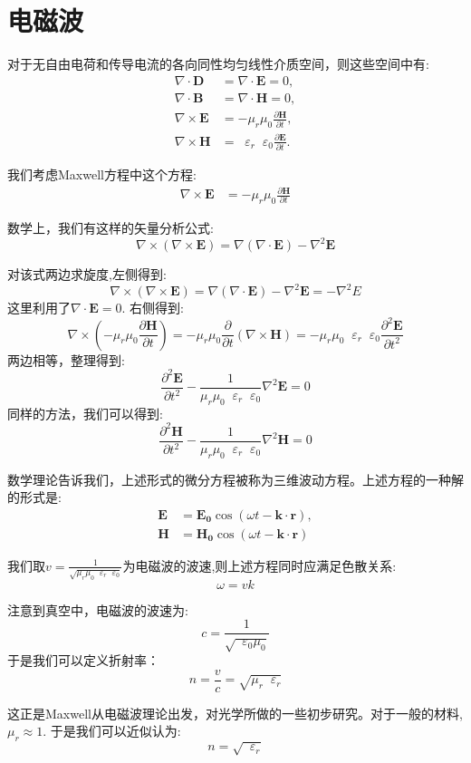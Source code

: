 \documentclass[12pt,a4paper,oneside]{report}
\theoremstyle{definition}
\theoremstyle{remark}
\newcommand{\mb}[1]{\mathbf{#1}}
\renewcommand{\v}{\mathop{}\!\varepsilon}
\begin{document}
\section{电磁波}
对于无自由电荷和传导电流的各向同性均匀线性介质空间，则这些空间中有:
\begin{align*}
\nabla\cdot\mathbf{D} &= \nabla\cdot\mathbf{E} =0, \\[4pt]
\nabla\cdot\mathbf{B} &= \nabla\cdot\mathbf{H}= 0, \\[4pt]
\nabla\times\mathbf{E} &= -\mu_r\mu_0\frac{\partial\mathbf{H}}{\partial t}, \\[4pt]
\nabla\times\mathbf{H} &= \v_r\v_0\frac{\partial\mathbf{E}}{\partial t}.
\end{align*}

我们考虑Maxwell方程中这个方程:
\begin{align*}
\nabla\times\mathbf{E} &= -\mu_r\mu_0\frac{\partial\mathbf{H}}{\partial t}
\end{align*}

数学上，我们有这样的矢量分析公式:
\[
\nabla \times  (\nabla \times \mb{E}) = \nabla(\nabla \cdot \mb{E})-\nabla^2 \mb{E}
\]

对该式两边求旋度,左侧得到:
\[
\nabla \times (\nabla \times \mb{E})= \nabla(\nabla \cdot \mb{E})-\nabla^2 \mb{E} = -\nabla^2 E
\]
这里利用了$\nabla\cdot\mathbf{E} =0$. 右侧得到:
\[
\nabla \times (-\mu_r\mu_0\frac{\partial\mathbf{H}}{\partial t}) = -\mu_r\mu_0\frac{\partial}{\partial t} (\nabla \times \mathbf{H}) = -\mu_r\mu_0\v_r\v_0 \frac{\partial^2 \mb{E}}{\partial t^2}
\]
两边相等，整理得到:
\[
\frac{\partial^2 \mb{E}}{\partial t^2} - \frac{1}{\mu_r\mu_0\v_r\v_0} \nabla^2 \mb{E} = 0
\]
同样的方法，我们可以得到:
\[
\frac{\partial^2 \mb{H}}{\partial t^2} - \frac{1}{\mu_r\mu_0\v_r\v_0} \nabla^2 \mb{H} = 0
\]

数学理论告诉我们，上述形式的微分方程被称为三维波动方程。上述方程的一种解的形式是:
\begin{align*}
\mb{E} &= \mb{E_0} \cos(\omega t - \mathbf k \cdot \mathbf r), \\[4pt]
\mb{H} &= \mb{H_0} \cos(\omega t - \mathbf k \cdot \mathbf r)
\end{align*}


我们取$v=\frac{1}{\sqrt{\mu_r\mu_0\v_r\v_0}}$为电磁波的波速,则上述方程同时应满足色散关系:
\[
\omega = vk
\]

注意到真空中，电磁波的波速为:
\[
c= \frac{1}{\sqrt{\v_0\mu_0}}
\]
于是我们可以定义折射率：
\[
n = \frac{v}{c} = \sqrt{\mu_r\v_r}
\]

这正是Maxwell从电磁波理论出发，对光学所做的一些初步研究。对于一般的材料,$\mu_r\approx 1$. 于是我们可以近似认为:
\[
n = \sqrt{\v_r}
\]
\end{document}
